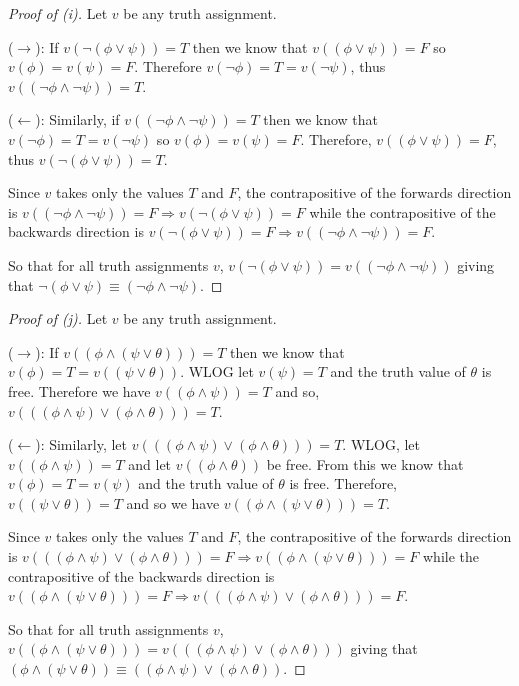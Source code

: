 \documentclass{article}
\theoremstyle{remark}\newtheorem{remark}{Remark}
\theoremstyle{plain}
\begin{document}
\begin{proof}[Proof of (i)]
    Let $v$ be any truth assignment.

    ($\rightarrow$):
    If $v(\neg(\phi \lor \psi)) = T$ then we know that $v((\phi \lor \psi)) = F$ so $v(\phi) = v(\psi) = F$. Therefore $v(\neg\phi) = T = v(\neg\psi)$, thus $v((\neg\phi \land \neg\psi)) = T$.

    ($\leftarrow$):
    Similarly, if $v((\neg\phi \land \neg\psi)) = T$ then we know that $v(\neg\phi) = T = v(\neg\psi)$ so $v(\phi) = v(\psi) = F$. Therefore, $v((\phi\lor\psi)) = F$, thus $v(\neg(\phi \lor \psi)) = T$.

    Since $v$ takes only the values $T$ and $F$, the contrapositive of the forwards direction is $v((\neg\phi \land \neg\psi)) = F \Rightarrow v(\neg(\phi \lor \psi)) = F$ while the contrapositive of the backwards direction is $v(\neg(\phi \lor \psi)) = F \Rightarrow v((\neg\phi \land \neg\psi)) = F$.

    So that for all truth assignments $v$, $v(\neg(\phi \lor \psi)) = v((\neg\phi \land \neg\psi))$ giving that $\neg(\phi \lor \psi) \equiv (\neg\phi \land \neg\psi)$.
\end{proof}

\begin{proof}[Proof of (j)]
    Let $v$ be any truth assignment.

    ($\rightarrow$):
    If $v((\phi \land (\psi \lor \theta))) = T$ then we know that $v(\phi) = T = v((\psi\lor\theta))$. WLOG let $v(\psi) = T$ and the truth value of $\theta$ is free. Therefore we have $v((\phi \land \psi)) = T$ and so, $v(((\phi \land \psi) \lor (\phi \land \theta))) = T$.

    ($\leftarrow$):
    Similarly, let $v(((\phi \land \psi) \lor (\phi \land \theta))) = T$. WLOG, let $v((\phi \land \psi)) = T$ and let $v((\phi \land \theta))$ be free. From this we know that $v(\phi) = T = v(\psi)$ and the truth value of $\theta$ is free. Therefore, $v((\psi \lor \theta)) = T$ and so we have $v((\phi \land (\psi \lor \theta))) = T$.

    Since $v$ takes only the values $T$ and $F$, the contrapositive of the forwards direction is $v(((\phi \land \psi) \lor (\phi \land \theta))) = F \Rightarrow v((\phi \land (\psi \lor \theta))) = F$ while the contrapositive of the backwards direction is $v((\phi \land (\psi \lor \theta))) = F \Rightarrow v(((\phi \land \psi) \lor (\phi \land \theta))) = F$.

    So that for all truth assignments $v$, $v((\phi \land (\psi \lor \theta))) = v(((\phi \land \psi) \lor (\phi \land \theta)))$ giving that $(\phi \land (\psi \lor \theta)) \equiv ((\phi \land \psi) \lor (\phi \land \theta))$.
\end{proof}
\end{document}
